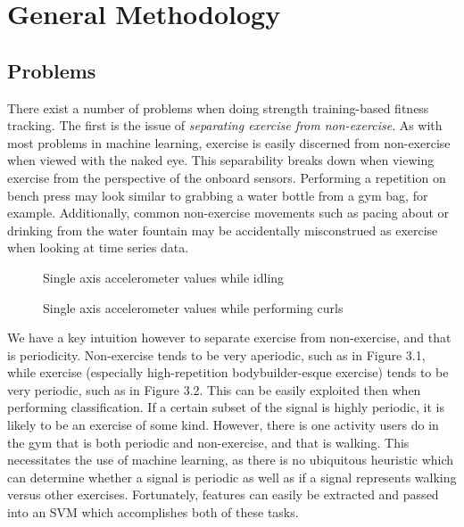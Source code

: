 \chapter{General Methodology}

\section{Problems}

There exist a number of problems when doing strength training-based fitness tracking. The first is the issue of \textit{separating exercise from non-exercise}. As with most problems in machine learning, exercise is easily discerned from non-exercise when viewed with the naked eye. This separability breaks down when viewing exercise from the perspective of the onboard sensors. Performing a repetition on bench press may look similar to grabbing a water bottle from a gym bag, for example. Additionally, common non-exercise movements such as pacing about or drinking from the water fountain may be accidentally misconstrued as exercise when looking at time series data. 

\begin{figure}
    \centering
    \caption{Single axis accelerometer values while idling}
\end{figure}

\begin{figure}
    \centering
    \caption{Single axis accelerometer values while performing curls}
\end{figure}

We have a key intuition however to separate exercise from non-exercise, and that is periodicity. Non-exercise tends to be very aperiodic, such as in Figure 3.1, while exercise (especially high-repetition bodybuilder-esque exercise) tends to be very periodic, such as in Figure 3.2. This can be easily exploited then when performing classification. If a certain subset of the signal is highly periodic, it is likely to be an exercise of some kind. However, there is one activity users do in the gym that is both periodic and non-exercise, and that is walking. This necessitates the use of machine learning, as there is no ubiquitous heuristic which can determine whether a signal is periodic as well as if a signal represents walking versus other exercises. Fortunately, features can easily be extracted and passed into an SVM which accomplishes both of these tasks.

